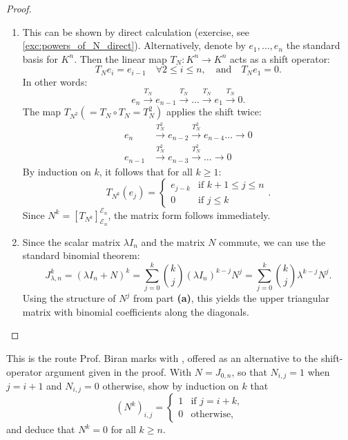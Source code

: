 \begin{proof}
\leavevmode
\begin{enumerate}[label=\textbf{(\alph*)}]
    \item This can be shown by direct calculation (exercise, see \cref{exc:powers_of_N_direct}). Alternatively, denote by $e_1, \dots, e_n$ the standard basis for $K^n$. Then the linear map $T_N \colon K^n \to K^n$ acts as a shift operator:
    \[
    T_N e_i = e_{i-1} \quad \forall 2 \le i \le n, \quad \text{and} \quad T_N e_1 = 0.
    \]
    In other words:
    \[
    e_n \xrightarrow{T_N} e_{n-1} \xrightarrow{T_N} \dots \xrightarrow{T_N} e_1 \xrightarrow{T_N} 0.
    \]
    The map $T_{N^2} (= T_N \circ T_N = T_N^2)$ applies the shift twice:
    \begin{align*}
    e_n &\xrightarrow{T_N^2} e_{n-2} \xrightarrow{T_N^2} e_{n-4} \dots \to 0 \\
    e_{n-1} &\xrightarrow{T_N^2} e_{n-3} \xrightarrow{T_N^2} \dots \to 0
    \end{align*}
    By induction on $k$, it follows that for all $k \ge 1$:
    \[
    T_{N^k}(e_j) = \begin{cases} e_{j-k} & \text{if } k+1 \le j \le n \\ 0 & \text{if } j \le k \end{cases}.
    \]
    Since $N^k = [T_{N^k}]_{\mathcal{E}_n}^{\mathcal{E}_n}$, the matrix form follows immediately.
    
    \item Since the scalar matrix $\lambda I_n$ and the matrix $N$ commute, we can use the standard binomial theorem:
    \[
    J_{\lambda, n}^k = (\lambda I_n + N)^k = \sum_{j=0}^k \binom{k}{j} (\lambda I_n)^{k-j} N^j = \sum_{j=0}^k \binom{k}{j} \lambda^{k-j} N^j.
    \]
    Using the structure of $N^j$ from part \textbf{(a)}, this yields the upper triangular matrix with binomial coefficients along the diagonals.
\end{enumerate}
\end{proof}

\begin{exercise}
\label{exc:powers_of_N_direct}
This is the route Prof. Biran marks with , offered as an alternative to the shift-operator argument given in the proof. With $N = J_{0,n}$, so that $N_{i,j} = 1$ when $j = i+1$ and $N_{i,j} = 0$ otherwise, show by induction on $k$ that
\[ \left(N^k\right)_{i,j} = \begin{cases} 1 & \text{if } j = i + k, \\ 0 & \text{otherwise,} \end{cases} \]
and deduce that $N^k = 0$ for all $k \ge n$.
\end{exercise}

